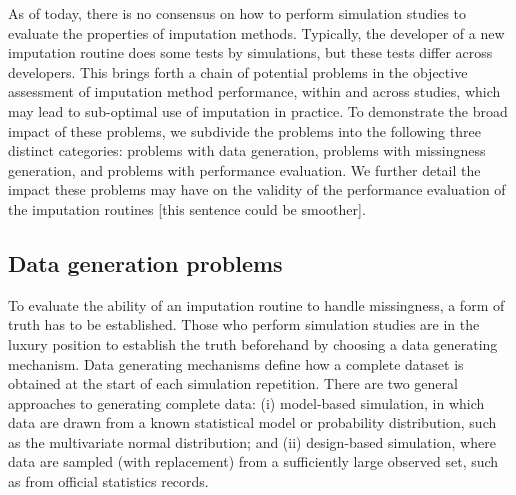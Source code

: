 \documentclass[bimj,fleqn]{w-art}
\begin{document}
As of today, there is no consensus on how to perform simulation studies to evaluate the properties of imputation methods. Typically, the developer of a new imputation routine does some tests by simulations, but these tests differ across developers. This brings forth a chain of potential problems in the objective assessment of imputation method performance, within and across studies, which may lead to sub-optimal use of imputation in practice. To demonstrate the broad impact of these problems, we subdivide the problems into the following three distinct categories: problems with data generation, problems with missingness generation, and problems with performance evaluation. We further detail the impact these problems may have on the validity of the performance evaluation of the imputation routines [this sentence could be smoother]. 


\subsection{Data generation problems}

To evaluate the ability of an imputation routine to handle missingness, a form of truth has to be established. Those who perform simulation studies are in the luxury position to establish the truth beforehand by choosing a data generating mechanism. Data generating mechanisms define how a complete dataset is obtained at the start of each simulation repetition. There are two general approaches to generating complete data: (i) model-based simulation, in which data are drawn from a known statistical model or probability distribution, such as the multivariate normal distribution; and (ii) design-based simulation, where data are sampled (with replacement) from a sufficiently large observed set, such as from official statistics records.
\end{document}
